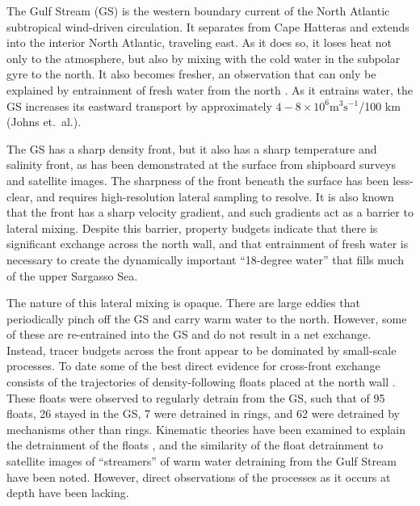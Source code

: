 \documentclass{natureJMK}
\begin{document}
The Gulf Stream (GS) is the western boundary current of the North Atlantic subtropical wind-driven circulation.  It separates from Cape Hatteras and extends into the interior North Atlantic, traveling east.  As it does so, it loses heat not only to  the atmosphere, but also by mixing with the cold water in the subpolar gyre to the north.  It also becomes fresher, an observation that can only be explained by entrainment of fresh water from the north \cite{joyceetal13}.  As it entrains water, the GS  increases its eastward transport by approximately $4-8\times 10^6 \mathrm{m^3s^{-1}}$/100 km (Johns et.\ al.\cite{johnsetal95}).   

The GS has a sharp density front, but it also has a sharp temperature and salinity front, as has been demonstrated at the surface from shipboard surveys\cite{fordetal52} and satellite images\cite{churchilletal89}. The sharpness of the front beneath the surface has been less-clear, and requires high-resolution lateral sampling to resolve. It is also known that the front has a sharp velocity gradient\cite{rajamonyetal01}, and such gradients act as a barrier to lateral mixing\cite{marshalletal06,naveiraetal11}.  Despite this  barrier, property budgets indicate that there is significant exchange across the north wall\cite{joyceetal13}, and that entrainment of fresh water is necessary to create the dynamically important ``18-degree water'' that fills much of the upper Sargasso Sea. 

The nature of this lateral mixing is opaque.  There are large eddies that periodically pinch off the GS and carry warm water to the north. However, some of these are re-entrained into the GS and do not result in a net exchange. Instead, tracer budgets across the front appear to be dominated by small-scale processes\cite{boweretal85}. To date some of the best direct evidence for cross-front exchange consists of the trajectories of density-following floats placed at the north wall \cite{bowerrossby89,bowerlozier94}.  These floats were observed to regularly detrain from the GS, such that of 95 floats, 26 stayed in the GS, 7 were detrained in rings, and 62 were detrained by mechanisms other than rings\cite{bowerlozier94}.  Kinematic theories have been examined to explain the detrainment of the floats \cite{flierletal87,stern85,prattetal95}, and the similarity of the float detrainment to satellite images of ``streamers'' of warm water detraining from the Gulf Stream have been noted.  However, direct observations of the  processes as it occurs at depth have been lacking.  
\end{document}
